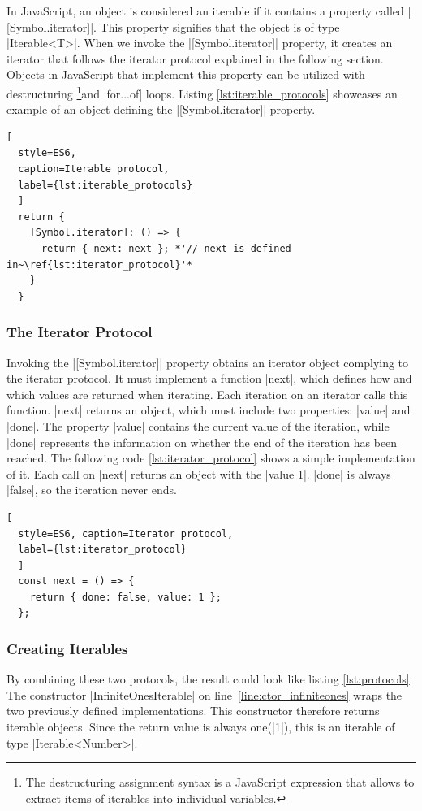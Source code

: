 In JavaScript, an object is considered an iterable if it contains a property
called |[Symbol.iterator]|. This property signifies that the object is of type
|Iterable<T>|. When we invoke the |[Symbol.iterator]| property, it creates an
iterator that follows the iterator protocol explained in the following section.
Objects in JavaScript that implement this property can be utilized with
destructuring \footnote{The destructuring assignment syntax is a JavaScript
expression that allows to extract items of iterables into individual
variables.}and |for...of| loops. Listing \ref{lst:iterable_protocols}
showcases an example of an object defining the |[Symbol.iterator]| property.

\begin{lstlisting}[
  style=ES6, 
  caption=Iterable protocol,
  label={lst:iterable_protocols}
  ]
  return {
    [Symbol.iterator]: () => {
      return { next: next }; *'// next is defined in~\ref{lst:iterator_protocol}'*
    }
  }
\end{lstlisting}

\subsubsection{The Iterator Protocol}
\label{subsub:The Iterator Protocol}
Invoking the |[Symbol.iterator]| property obtains an iterator object
complying to the iterator protocol. It must implement a function |next|, which
defines how and which values are returned when iterating. Each iteration on an
iterator calls this function. |next| returns an object, which must
include two properties: |value| and |done|. The property |value|
contains the current value of the iteration, while |done| represents the
information on whether the end of the iteration has been reached. The following
code \ref{lst:iterator_protocol} shows a simple implementation of it. Each call
on |next| returns an object with the |value 1|. |done| is always |false|, so
the iteration never ends. 

\begin{lstlisting}[
  style=ES6, caption=Iterator protocol,
  label={lst:iterator_protocol}
  ]
  const next = () => {
    return { done: false, value: 1 };
  };
\end{lstlisting}

\subsubsection{Creating Iterables}
\label{subsub:Creating Iterables}
By combining these two protocols, the result could look like listing
\ref{lst:protocols}. The constructor |InfiniteOnesIterable| on
line~\ref{line:ctor_infiniteones} wraps the two
previously defined implementations. This constructor therefore returns iterable
objects. Since the return value is always one(|1|), this is an iterable of
type |Iterable<Number>|.

